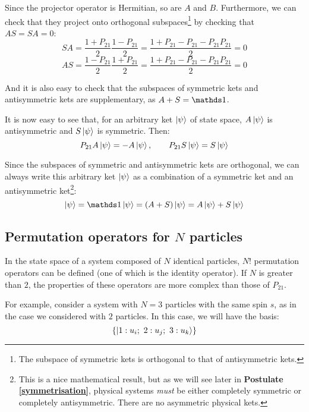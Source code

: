 Since the projector operator is Hermitian, so are $A$ and $B$. Furthermore, we can check that they project onto orthogonal subspaces\footnote{The subspace of symmetric kets is orthogonal to that of antisymmetric kets.} by checking that $AS = SA = 0$:
\begin{equation}
    SA = \frac{1+P_{21}}{2}\frac{1-P_{21}}{2} = \frac{1 + P_{21}- P_{21} - P_{21}P_{21}}{2} = 0
\end{equation}
\begin{equation}
    AS = \frac{1-P_{21}}{2}\frac{1+P_{21}}{2} = \frac{1 + P_{21}- P_{21} - P_{21}P_{21}}{2} = 0
\end{equation}

And it is also easy to check that the subspaces of symmetric kets and antisymmetric  kets are supplementary, as $A+S = \Imat$. 

It is now easy to see that, for an arbitrary ket $\ket{\psi}$ of state space, $A\ket{\psi}$ is antisymmetric and $S\ket{\psi}$ is symmetric. Then:
\begin{equation}
    P_{21}A\ket{\psi} = -A\ket{\psi}, \qquad P_{21}S\ket{\psi} = S\ket{\psi}
\end{equation}

Since the subspaces of symmetric and antisymmetric kets are orthogonal, we can always write this arbitrary ket $\ket{\psi}$ as a combination of a symmetric ket and an antisymmetric ket\footnote{This is a nice mathematical result, but as we will see later in \textbf{Postulate \ref{symmetrisation}}, physical systems \textit{must} be either completely symmetric or completely antisymmetric. There are no asymmetric physical kets.}:
\begin{equation}
    \ket{\psi} = \Imat\ket{\psi} = \left(A + S\right)\ket{\psi} = A\ket{\psi} + S\ket{\psi}
\end{equation} 

\subsection{Permutation operators for $N$ particles}

In the state space of a system composed of $N$ identical particles, $N!$ permutation operators can be defined (one of which is the identity operator). If $N$ is greater than $2$, the properties of these operators are more complex than those of $P_{21}$.

For example, consider a system with $N=3$ particles with the same spin $s$, as in the case we considered with $2$ particles. In this case, we will have the basis:
\begin{equation}
    \{\ket{1:u_i;\ 2: u_j;\ 3: u_k}\}
\end{equation}

